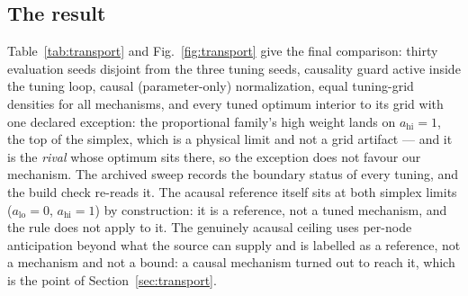 \documentclass[journal]{IEEEtran}
\theoremstyle{definition}
\begin{document}
\subsection{The result}
Table~\ref{tab:transport} and Fig.~\ref{fig:transport} give the final
comparison: thirty evaluation seeds disjoint from the three tuning seeds,
causality guard active inside the tuning loop, causal (parameter-only)
normalization, equal tuning-grid densities for all mechanisms, and every tuned optimum
interior to its grid with one declared exception: the proportional family's
high weight lands on $a_{\mathrm{hi}}=1$, the top of the simplex, which is a
physical limit and not a grid artifact --- and it is the \emph{rival} whose
optimum sits there, so the exception does not favour our mechanism. The
archived sweep records the boundary status of every tuning, and the build
check re-reads it. The acausal reference itself sits at both simplex limits
($a_{\mathrm{lo}}=0$, $a_{\mathrm{hi}}=1$) by construction: it is a reference,
not a tuned mechanism, and the rule does not apply to it. The genuinely
acausal ceiling uses per-node anticipation beyond what the source can
supply and is labelled as a reference, not a mechanism and not a bound:
a causal mechanism turned out to reach it, which is the point of
Section~\ref{sec:transport}.
\end{document}
